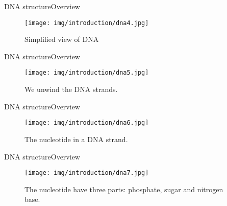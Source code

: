 \documentclass[10pt]{beamer}
\newcommand{\1}{
	\setbeamertemplate{background}{
		\texttt{[image: img/1]}
		\tikz[overlay] \fill[fill opacity=0.75,fill=white] (0,0) rectangle (-\paperwidth,\paperheight);
	}
}
\begin{document}
\begin{frame}{DNA structure}{Overview}
	\begin{figure}[]
		\centering
		\texttt{[image: img/introduction/dna4.jpg]}
		\label{img:mot2}
		\caption{Simplified view of DNA}
	\end{figure}
\end{frame}

\begin{frame}{DNA structure}{Overview}
	\begin{figure}[]
		\centering
		\texttt{[image: img/introduction/dna5.jpg]}
		\label{img:mot2}
		\caption{We unwind the DNA strands.}
	\end{figure}
\end{frame}

\begin{frame}{DNA structure}{Overview}
	\begin{figure}[]
		\centering
		\texttt{[image: img/introduction/dna6.jpg]}
		\label{img:mot2}
		\caption{The nucleotide in a DNA strand.}
	\end{figure}
\end{frame}

\begin{frame}{DNA structure}{Overview}
	\begin{figure}[]
		\centering
		\texttt{[image: img/introduction/dna7.jpg]}
		\label{img:mot2}
		\caption{The nucleotide have three parts: phosphate, sugar and nitrogen base.}
	\end{figure}
\end{frame}
\end{document}
